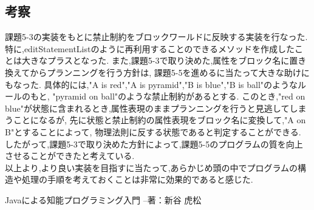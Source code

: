 \documentclass[uplatex,12pt]{jsarticle}
\begin{document}
\subsection{考察}
課題5-3の実装をもとに禁止制約をブロックワールドに反映する実装を行なった.
特に,editStatementListのように再利用することのできるメソッドを作成したことは大きなプラスとなった.
また,課題5-3で取り決めた,属性をブロック名に置き換えてからプランニングを行う方針は,
課題5-5を進めるに当たって大きな助けにもなった.
具体的には,"A is red","A is pyramid","B is blue","B is ball"のようなルールのもと,
"pyramid on ball"のような禁止制約があるとする.
このとき,"red on blue"が状態に含まれるとき,属性表現のままプランニングを行うと見逃してしまうことになるが,
先に状態と禁止制約の属性表現をブロック名に変換して,"A on B"とすることによって,
物理法則に反する状態であると判定することができる. \\
したがって,課題5-3で取り決めた方針によって,課題5-5のプログラムの質を向上させることができたと考えている. \\
以上より,より良い実装を目指すに当たって,あらかじめ頭の中でプログラムの構造や処理の手順を考えておくことは非常に効果的であると感じた.

\begin{thebibliography}{99}
 Javaによる知能プログラミング入門 --著：新谷 虎松 \\
\end{thebibliography}
\end{document}
